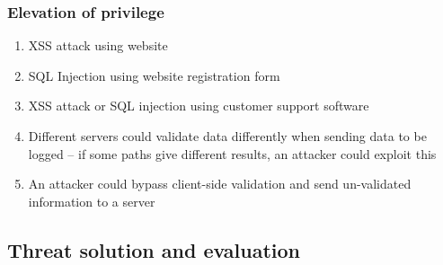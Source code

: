 \subsubsection{Elevation of privilege}

\begin{enumerate}[resume]
    \item XSS attack using website
    \item SQL Injection using website registration form
    \item XSS attack or SQL injection using customer support software
    \item Different servers could validate data differently when sending data to be logged – if some paths give different results, an attacker could exploit this
    \item An attacker could bypass client-side validation and send un-validated information to a server
\end{enumerate}

\subsection{Threat solution and evaluation}

